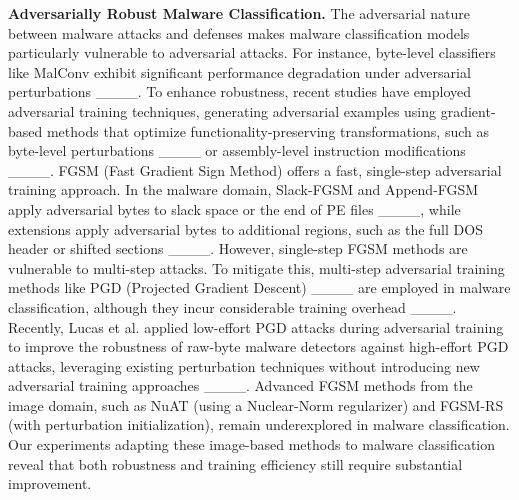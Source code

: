 \vspace{0.1cm}
\noindent\textbf{Adversarially Robust Malware Classification. } 
The adversarial nature between malware attacks and defenses makes malware classification models particularly vulnerable to adversarial attacks. For instance, byte-level classifiers like MalConv exhibit significant performance degradation under adversarial perturbations ____. To enhance robustness, recent studies have employed adversarial training techniques, generating adversarial examples using gradient-based methods that optimize functionality-preserving transformations, such as byte-level perturbations ____ or assembly-level instruction modifications ____. FGSM (Fast Gradient Sign Method) offers a fast, single-step adversarial training approach. In the malware domain, Slack-FGSM and Append-FGSM apply adversarial bytes to slack space or the end of PE files ____, while extensions apply adversarial bytes to additional regions, such as the full DOS header or shifted sections ____. However, single-step FGSM methods are vulnerable to multi-step attacks. To mitigate this, multi-step adversarial training methods like PGD (Projected Gradient Descent) ____ are employed in malware classification, although they incur considerable training overhead ____. Recently, Lucas et al. applied low-effort PGD attacks during adversarial training to improve the robustness of raw-byte malware detectors against high-effort PGD attacks, leveraging existing perturbation techniques without introducing new adversarial training approaches ____. Advanced FGSM methods from the image domain, such as NuAT (using a Nuclear-Norm regularizer) and FGSM-RS (with perturbation initialization), remain underexplored in malware classification. Our experiments adapting these image-based methods to malware classification reveal that both robustness and training efficiency still require substantial improvement.







